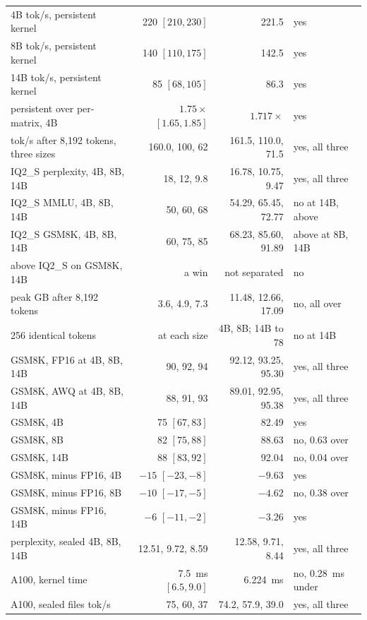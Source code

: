 \begin{table}[!t]
\begin{tabular}{lrrl}
4B tok/s, persistent kernel & 220 $[210, 230]$ & 221.5 & yes\\
8B tok/s, persistent kernel & 140 $[110, 175]$ & 142.5 & yes\\
14B tok/s, persistent kernel & 85 $[68, 105]$ & 86.3 & yes\\
persistent over per-matrix, 4B & $1.75\times$ $[1.65, 1.85]$ & $1.717\times$ & yes\\
tok/s after 8{,}192 tokens, three sizes & 160.0, 100, 62 & 161.5, 110.0, 71.5 & yes, all three\\
IQ2\_S perplexity, 4B, 8B, 14B & 18, 12, 9.8 & 16.78, 10.75, 9.47 & yes, all three\\
IQ2\_S MMLU, 4B, 8B, 14B & 50, 60, 68 & 54.29, 65.45, 72.77 & no at 14B, above\\
IQ2\_S GSM8K, 4B, 8B, 14B & 60, 75, 85 & 68.23, 85.60, 91.89 & above at 8B, 14B\\
\Tetra{} above IQ2\_S on GSM8K, 14B & a win & not separated & no\\
\Tetra{} peak GB after 8{,}192 tokens & 3.6, 4.9, 7.3 & 11.48, 12.66, 17.09 & no, all over\\
256 identical tokens & at each size & 4B, 8B; 14B to 78 & no at 14B\\
GSM8K, FP16 at 4B, 8B, 14B & 90, 92, 94 & 92.12, 93.25, 95.30 & yes, all three\\
GSM8K, AWQ at 4B, 8B, 14B & 88, 91, 93 & 89.01, 92.95, 95.38 & yes, all three\\
GSM8K, \Tetra{} 4B & 75 $[67, 83]$ & 82.49 & yes\\
GSM8K, \Tetra{} 8B & 82 $[75, 88]$ & 88.63 & no, 0.63 over\\
GSM8K, \Tetra{} 14B & 88 $[83, 92]$ & 92.04 & no, 0.04 over\\
GSM8K, \Tetra{} minus FP16, 4B & $-15$ $[-23, -8]$ & $-9.63$ & yes\\
GSM8K, \Tetra{} minus FP16, 8B & $-10$ $[-17, -5]$ & $-4.62$ & no, 0.38 over\\
GSM8K, \Tetra{} minus FP16, 14B & $-6$ $[-11, -2]$ & $-3.26$ & yes\\
perplexity, sealed 4B, 8B, 14B & 12.51, 9.72, 8.59 & 12.58, 9.71, 8.44 & yes, all three\\
A100, \Tetra{} kernel time & 7.5~ms $[6.5, 9.0]$ & 6.224~ms & no, 0.28~ms under\\
A100, sealed files tok/s & 75, 60, 37 & 74.2, 57.9, 39.0 & yes, all three\\
\bottomrule
\end{tabular}
\end{table}
